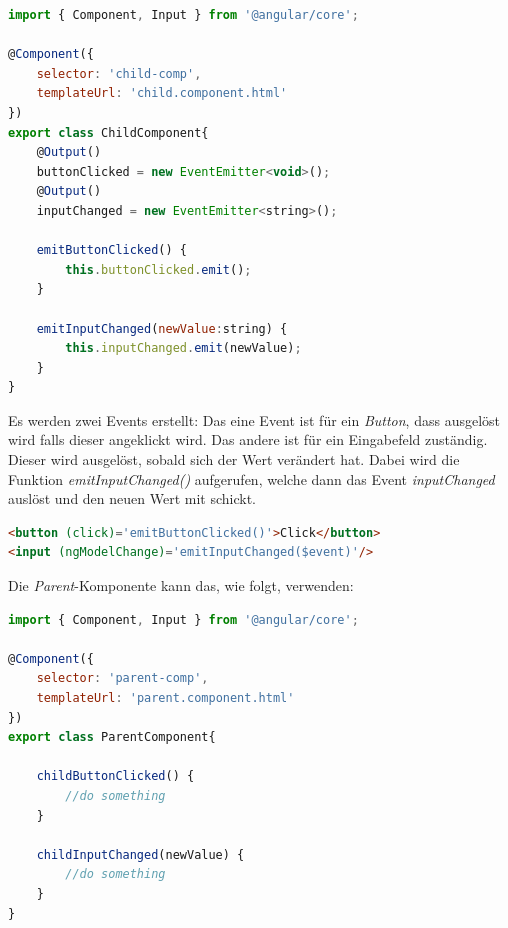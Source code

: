 \begin{itemize}
\lstset{escapechar=?,style=customjava}
\begin{lstlisting}[language=javascript, caption=Beispiel von \textit{event binding} (\textit{child.component.ts} - Datei), captionpos=t]
import { Component, Input } from '@angular/core';

@Component({
	selector: 'child-comp',
	templateUrl: 'child.component.html'
})
export class ChildComponent{
    @Output()
    buttonClicked = new EventEmitter<void>();
    @Output()
    inputChanged = new EventEmitter<string>();
    
    emitButtonClicked() {
        this.buttonClicked.emit();
    }
    
    emitInputChanged(newValue:string) {
        this.inputChanged.emit(newValue);
    }
}
\end{lstlisting}
\lstset{escapechar=@,style=customjava}


Es werden zwei Events erstellt: Das eine Event ist für ein \textit{Button}, dass ausgelöst wird falls dieser angeklickt wird. Das andere ist für ein Eingabefeld zuständig. Dieser wird ausgelöst, sobald sich der Wert verändert hat. Dabei wird die Funktion \textit{emitInputChanged()} aufgerufen, welche dann das Event \textit{inputChanged} auslöst und den neuen Wert mit schickt.

\lstset{escapechar=?,style=customjava}
\begin{lstlisting}[language=html, caption=Beispiel von \textit{event binding} (\textit{child.component.html} - Datei), captionpos=t]
<button (click)='emitButtonClicked()'>Click</button>
<input (ngModelChange)='emitInputChanged($event)'/>
\end{lstlisting}
\lstset{escapechar=@,style=customjava}

\clearpage
Die \textit{Parent}-Komponente kann das, wie folgt, verwenden:

\lstset{escapechar=?,style=customjava}
\begin{lstlisting}[language=javascript, caption=Beispiel von \textit{event binding} (\textit{parent.component.ts} - Datei), captionpos=t]
import { Component, Input } from '@angular/core';

@Component({
	selector: 'parent-comp',
	templateUrl: 'parent.component.html'
})
export class ParentComponent{
    
    childButtonClicked() {
        //do something
    }
    
    childInputChanged(newValue) {
        //do something
    }
}
\end{lstlisting}
\lstset{escapechar=@,style=customjava}


\end{itemize}
